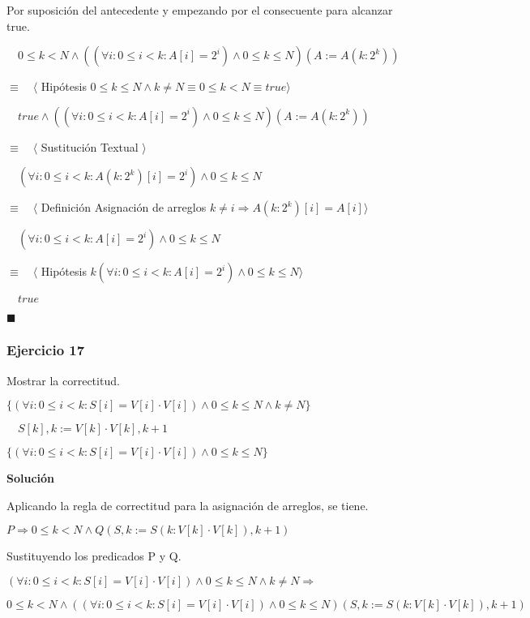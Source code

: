 \documentclass[hidelinks]{article}
\begin{document}
Por suposición del antecedente y empezando por el consecuente para alcanzar
true.\par
$\quad 0 \leq k < N \land ((\forall i : 0 \leq i < k : A[i] = 2^i) \land 0 \leq k \leq N)(A := A(k : 2^k))$\par
$\equiv \quad \langle$ Hipótesis $ 0 \leq k \leq N \land k \neq N \equiv 0 \leq k < N \equiv true \rangle$\par
$\quad true \land ((\forall i : 0 \leq i < k : A[i] = 2^i) \land 0 \leq k \leq N)(A := A(k : 2^k))$\par
$\equiv \quad \langle$ Sustitución Textual $ \rangle$\par
$\quad (\forall i : 0 \leq i < k : A(k : 2^k)[i] = 2^i) \land 0 \leq k \leq N$\par
$\equiv \quad \langle$ Definición Asignación de arreglos $ k \neq i \Rightarrow A(k : 2^k)[i] = A[i] \rangle$\par
$\quad (\forall i : 0 \leq i < k : A[i] = 2^i) \land 0 \leq k \leq N$\par
$\equiv \quad \langle$ Hipótesis $ k (\forall i : 0 \leq i < k : A[i] = 2^i) \land 0 \leq k \leq N \rangle$\par
$\quad true $\par
$\blacksquare$\par

\newpage

\subsubsection{Ejercicio 17}


Mostrar la correctitud.\par
$\{ (\forall i : 0 \leq i < k : S[i] = V[i] \cdot V[i]) \land 0 \leq k \leq N \land k \neq N\}$\par
$\quad S[k],k := V[k] \cdot V[k], k+1$\par
$\{ (\forall i : 0 \leq i < k : S[i] = V[i] \cdot V[i]) \land 0 \leq k \leq N\}$\par

\textbf{Solución}\par

Aplicando la regla de correctitud para la asignación de arreglos, se tiene.\par
$P \Rightarrow 0 \leq k < N \land Q(S, k := S(k : V[k] \cdot V[k]), k+1)$\par

Sustituyendo los predicados P y Q.\par
$(\forall i : 0 \leq i < k : S[i] = V[i] \cdot V[i]) \land 0 \leq k \leq N \land k \neq N \Rightarrow$\par
$0 \leq k < N \land ((\forall i : 0 \leq i < k : S[i] = V[i] \cdot V[i]) \land 0 \leq k \leq N)(S, k := S(k : V[k] \cdot V[k]), k+1)$\par
\end{document}
